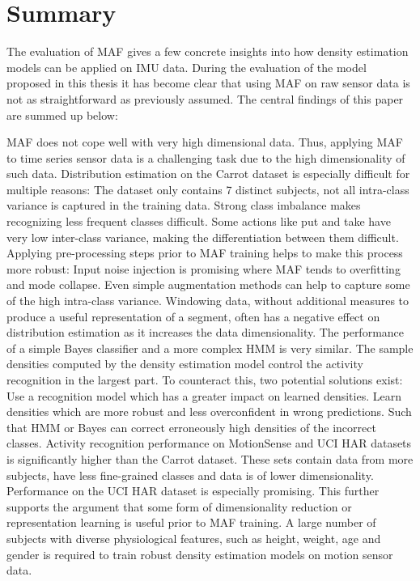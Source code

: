 \documentclass[11pt,titlepage,oneside,openany]{book}
\begin{document}
\section{Summary}
\label{sec:sum}
The evaluation of MAF gives a few concrete insights into how density estimation models can be applied on IMU data. During the  evaluation of the model proposed in this thesis it has become clear that using MAF on raw sensor data is not as straightforward as previously assumed. The central findings of this paper are summed up below:
\begin{outline}
	\1 MAF does not cope well with very high dimensional data.
		\2 Thus, applying MAF to time series sensor data is a challenging task due to the high dimensionality of such data.
	\1 Distribution estimation on the Carrot dataset is especially difficult for multiple reasons:
		\2 The dataset only contains 7 distinct subjects, not all intra-class variance is captured in the training data.
		\2 Strong class imbalance makes recognizing less frequent classes difficult.
		\2 Some actions like put and take have very low inter-class variance, making the differentiation between them difficult.
	\1 Applying pre-processing steps prior to MAF training helps to make this process more robust: 
		\2 Input noise injection is promising where MAF tends to overfitting and mode collapse.
		\2 Even simple augmentation methods can help to capture some of the high intra-class variance.
	\1 Windowing data, without additional measures to produce a useful representation of a segment, often has a negative effect on distribution estimation as it increases the data dimensionality.
	\1 The performance of a simple Bayes classifier and a more complex HMM is very similar. The sample densities computed by the density estimation model control the activity recognition in the largest part. To counteract this, two potential solutions exist:
		\2 Use a recognition model which has a greater impact on learned densities.
		\2 Learn densities which are more robust and less overconfident in wrong predictions. Such that HMM or Bayes can correct erroneously high densities of the incorrect classes.
	\1 Activity recognition performance on MotionSense and UCI HAR datasets is significantly higher than the Carrot dataset. These sets contain data from more subjects, have less fine-grained classes and data is of lower dimensionality.
	\1 Performance on the UCI HAR dataset is especially promising. This further supports the argument that some form of dimensionality reduction or representation learning is useful prior to MAF training.
	\1 A large number of subjects with diverse physiological features, such as height, weight, age and gender is required to train robust density estimation models on motion sensor data.
\end{outline}
\end{document}
